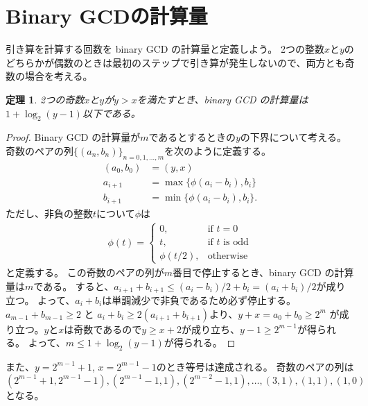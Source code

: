 \documentclass[a4paper,twoside,onecolumn,openany,article,10pt]{memoir}
\newtheorem{theorem}{定理}
\theoremstyle{remark}
\begin{document}
\section{Binary GCDの計算量}
引き算を計算する回数を binary GCD の計算量と定義しよう。
2つの整数$x$と$y$のどちらかが偶数のときは最初のステップで引き算が発生しないので、両方とも奇数の場合を考える。
\begin{theorem}
2つの奇数$x$と$y$が$y>x$を満たすとき、binary GCD の計算量は$1+\log_2(y-1)$以下である。
\end{theorem}
\begin{proof}
Binary GCD の計算量が$m$であるとするときの$y$の下界について考える。
奇数のペアの列$\{(a_n, b_n)\}_{n=0,1,\dotsc,m}$を次のように定義する。
\begin{align*}
(a_0, b_0) &= (y, x)\\
a_{i+1} &= \max\{\phi(a_{i}-b_{i}), b_i\}\\
b_{i+1} &= \min\{\phi(a_{i}-b_{i}), b_i\}.
\end{align*}
ただし、非負の整数$t$について$\phi$は
\begin{align*}
\phi(t)=\begin{cases}
0,&\text{if } t = 0\\
t,&\text{if $t$ is odd}\\
\phi(t/2),&\text{otherwise}
\end{cases}
\end{align*}
と定義する。
この奇数のペアの列が$m$番目で停止するとき、binary GCD の計算量は$m$である。
すると、$a_{i+1}+b_{i+1} \le (a_i-b_i)/2 + b_i = (a_i+b_i)/2$が成り立つ。
よって、$a_i+b_i$は単調減少で非負であるため必ず停止する。
$a_{m-1}+b_{m-1}\ge 2$ と $a_i+b_i\ge 2(a_{i+1}+b_{i+1})$より、$y+x=a_0+b_0\ge 2^{m}$
が成り立つ。$y$と$x$は奇数であるので$y\ge x+2$が成り立ち、$y-1\ge 2^{m-1}$が得られる。
よって、$m\le 1+\log_2(y-1)$が得られる。
\end{proof}
また、$y=2^{m-1}+1$, $x=2^{m-1}-1$のとき等号は達成される。
奇数のペアの列は
$(2^{m-1}+1, 2^{m-1}-1), (2^{m-1}-1, 1), (2^{m-2}-1, 1), \dotsc, (3,1), (1,1), (1,0)$
となる。
\end{document}

